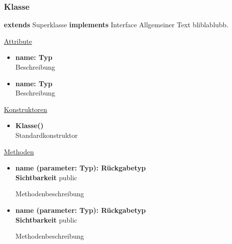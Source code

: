 \newpage
\subsubsection{Klasse}
\textbf{extends} Superklasse \newline
\textbf{implements} Interface \newline
Allgemeiner Text bliblablubb. \newline

\underline{Attribute}
\begin{itemize}
\itemsep0pt
\item \textbf{name: Typ} \hfill\\ 
Beschreibung

\item \textbf{name: Typ} \hfill\\ 
Beschreibung
\end{itemize}

\underline{Konstruktoren}
\begin{itemize}
\itemsep0pt
\item \textbf{Klasse()} \hfill\\
Standardkonstruktor
\end{itemize}

\underline{Methoden}
\begin{itemize}
\itemsep0pt
\item \textbf{name (parameter: Typ): Rückgabetyp}\hfill\\
\textbf{Sichtbarkeit} public

Methodenbeschreibung

\item \textbf{name (parameter: Typ): Rückgabetyp}\hfill\\
\textbf{Sichtbarkeit} public

Methodenbeschreibung

\end{itemize}